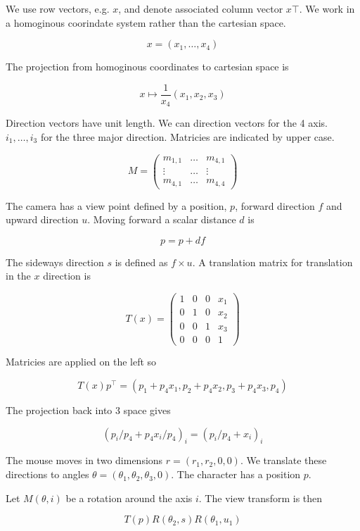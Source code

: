 \documentclass[12pt]{article}
\begin{document}
We use row vectors, e.g. $x$, and denote associated column vector
$x\top$. We work in a homoginous coorindate system rather than the
cartesian space.

\[
   x = (x_1,\dots,x_4)
\]

The projection from homoginous coordinates to cartesian space is

\[
   x \mapsto \frac{1}{x_4}(x_1, x_2, x_3)
\]

Direction vectors have unit length. We can direction vectors for the 4
axis. $i_1,\dots,i_3$ for the three major direction. Matricies
are indicated by upper case.

\[
   M = \left ( \begin{array}{ccc}
     m_{1,1} & \dots & m_{4,1}  \\
     \vdots & \dots & \vdots  \\
     m_{4,1} & \dots & m_{4,4}
     \end{array}
   \right )
\]

The camera has a view point defined by a position, $p$,
forward direction $f$ and upward direction $u$. Moving
forward a scalar distance $d$ is

\[
   p = p + df
\]

The sideways direction $s$ is defined as $f \times u$. A translation
matrix for translation in the $x$ direction is

\[
  T(x) = \left ( 
  \begin{array}{cccc}
     1 & 0 & 0 & x_1      \\
     0 & 1 & 0 & x_2      \\
     0 & 0 & 1 & x_3      \\
     0 & 0 & 0 & 1
  \end{array}
  \right )
\]

Matricies are applied on the left so

\[
  T(x) p^\top = (p_1 + p_4 x_1, p_2 + p_4 x_2, p_3 + p_4 x_3, p_4)
\]

The projection back into 3 space gives

\[
  (p_i / p_4 + p_4 x_i / p_4)_{i} = (p_i/p_4 + x_i)_{i}
\]

The mouse moves in two dimensions $r = (r_1, r_2, 0, 0)$. We translate
these directions to angles $\theta = (\theta_1, \theta_2, \theta_3, 0)$. The
character has a position $p$.

Let $M(\theta, i)$ be a rotation around the axis $i$. The view
transform is then

\[
  T(p) R(\theta_2, s) R(\theta_1, u_1) 
\]
\end{document}
